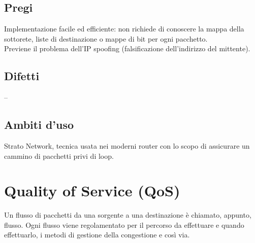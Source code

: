 \subsection{Pregi}
Implementazione facile ed efficiente: non richiede di conoscere la mappa della sottorete, liste di destinazione o mappe di bit per ogni pacchetto.\\
Previene il problema dell'IP spoofing (falsificazione dell'indirizzo del mittente).
\subsection{Difetti}
--
\subsection{Ambiti d'uso}
Strato Network, tecnica usata nei moderni router con lo scopo di assicurare un cammino di pacchetti privi di loop.

\section{Quality of Service (QoS)}

Un flusso di pacchetti da una sorgente a una destinazione è chiamato, appunto, flusso.
Ogni flusso viene regolamentato per il percorso da effettuare e quando effettuarlo, i metodi di gestione della congestione e così via.
